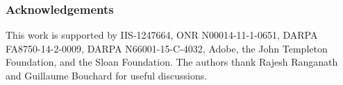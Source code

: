 \documentclass[]{article}
\begin{document}
\vspace*{-5pt}
\subsubsection*{Acknowledgements}
\vspace*{-5pt} This work is supported by IIS-1247664, ONR
N00014-11-1-0651, DARPA FA8750-14-2-0009, DARPA N66001-15-C-4032,
Adobe, the John Templeton Foundation, and the Sloan Foundation.  The
authors thank Rajesh Ranganath and Guillaume Bouchard for useful discussions.


\vspace*{-5pt}


%

\end{document}
